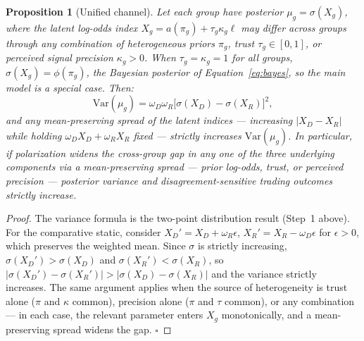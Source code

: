 \documentclass[12pt]{article}
\newtheorem{proposition}{Proposition}
\begin{document}
\begin{proposition}[Unified channel]
\label{prop:unified}
\label{prop:trust}
\label{prop:precision}
Let each group have posterior $\mu_g = \sigma(X_g)$, where the latent
log-odds index $X_g = a(\pi_g) + \tau_g \kappa_g \ell$ may differ across
groups through any combination of heterogeneous priors $\pi_g$, trust
$\tau_g \in [0,1]$, or perceived signal precision $\kappa_g > 0$.
When $\tau_g = \kappa_g = 1$ for all groups, $\sigma(X_g) = \phi(\pi_g)$,
the Bayesian posterior of Equation~\eqref{eq:bayes}, so the main model is
a special case. Then:
\[
    \mathrm{Var}(\mu_g) = \omega_D \omega_R \bigl[\sigma(X_D) - \sigma(X_R)\bigr]^2,
\]
and any mean-preserving spread of the latent indices --- increasing
$|X_D - X_R|$ while holding $\omega_D X_D + \omega_R X_R$ fixed --- strictly
increases $\mathrm{Var}(\mu_g)$.
In particular, if polarization widens the cross-group gap in any one of the
three underlying components via a mean-preserving spread --- prior log-odds,
trust, or perceived precision --- posterior variance and disagreement-sensitive
trading outcomes strictly increase.
\end{proposition}

\begin{proof}
The variance formula is the two-point distribution result (Step~1 above).
For the comparative static, consider $X_D' = X_D + \omega_R\epsilon$,
$X_R' = X_R - \omega_D\epsilon$ for $\epsilon > 0$, which preserves the
weighted mean. Since $\sigma$ is strictly increasing,
$\sigma(X_D') > \sigma(X_D)$ and $\sigma(X_R') < \sigma(X_R)$, so
$|\sigma(X_D')-\sigma(X_R')| > |\sigma(X_D)-\sigma(X_R)|$ and the variance
strictly increases. The same argument applies when the source of
heterogeneity is trust alone ($\pi$ and $\kappa$ common), precision alone
($\pi$ and $\tau$ common), or any combination --- in each case, the relevant
parameter enters $X_g$ monotonically, and a mean-preserving spread widens
the gap. $\square$
\end{proof}
\end{document}

